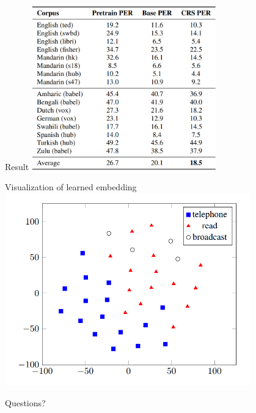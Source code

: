 \documentclass{beamer}
\begin{document}
\begin{frame}{Result}
  \center \includegraphics[width=0.6\textwidth]{fig/CRS-result.png}
\end{frame}

\begin{frame}{Visualization of learned embedding}
  \center \includegraphics[width=0.8\textwidth]{fig/CRS-embedding.png}
\end{frame}


\begin{frame}
	\begin{center}
    \LARGE{Questions?}
	\end{center}
\end{frame}
\end{document}
